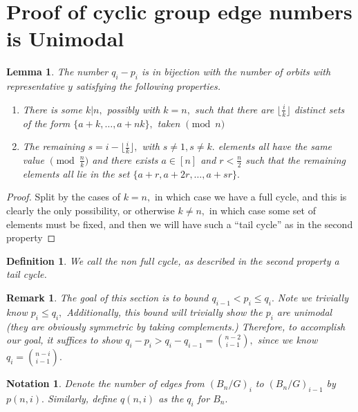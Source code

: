 \documentclass{amsart}
\newtheorem{lem}[subsubsection]{Lemma}
\newtheorem{defn}[subsubsection]{Definition}
\newtheorem{rem}[subsubsection]{Remark}
\newtheorem{note}[subsubsection]{Notation}
\begin{document}
\section{Proof of cyclic group edge numbers is Unimodal}

\begin{lem}
\label{orbit_differences}
The number $q_i - p_i$ is in bijection with the number of orbits with representative $y$ satisfying the following properties.
\begin{enumerate}
	\item There is some $k | n,$ possibly with $k = n,$ such that there are $\lfloor \frac{i}{k} \rfloor$ distinct sets of the form $\{a+k,\ldots,a+nk\},$ taken $\pmod n$
	\item The remaining  $s = i-\lfloor \frac{i}{k} \rfloor,$ with $s \neq 1,s \neq k.$ elements all have the same value $\pmod \frac{n}{k}$ and there exists $a \in [n]$ and $r < \frac{n}{2}$ such that the remaining elements all lie in the set $\{a+r,a+2r,\ldots, a+sr\}.$
\end{enumerate} 
\end{lem}
\begin{proof}
Split by the cases of $k = n,$ in which case we have a full cycle, and this is clearly the only possibility, or otherwise $k \neq n,$ in which case some set of elements must be fixed, and then we will have such a ``tail cycle'' as in the second property
\end{proof}

\begin{defn}
We call the non full cycle, as described in the second property a tail cycle.
\end{defn}

\begin{rem}
The goal of this section is to bound $q_{i-1} <p_i \leq q_i.$ Note we trivially know $p_i \leq q_i,$ Additionally, this bound will trivially show the $p_i$ are unimodal (they are obviously symmetric by taking complements.) Therefore, to accomplish our goal, it suffices to show $q_i - p_i > q_i - q_{i-1} = \binom {n-2}{i-1},$ since we know $q_i = \binom {n-i}{i-1}.$
\end{rem}

\begin{note}
Denote the number of edges from $(B_n/G)_i$ to $(B_n/G)_{i-1}$ by $p(n,i).$ Similarly, define $q(n,i)$ as the $q_i$ for $B_n.$
\end{note}
\end{document}
